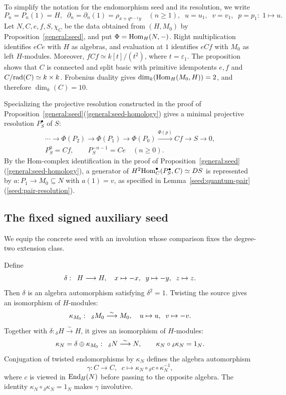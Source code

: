 \documentclass[11pt]{article}
\begin{document}
To simplify the notation for the endomorphism seed and its resolution, we write
$$P_n=P_n(1)=H,\;\; \partial_n=\partial_n(1)=\rho_{x+q^{n-1}y}\quad(n\geq 1),\;\; u=u_1,\;\;  v=v_1, \;\;  p=p_1:\; 1\mapsto u.$$
Let $N,C,e,f,S,\chi_C$ be the data obtained from $(H,M_0)$ by Proposition~\ref{general:seed}, and put
$\Phi={\rm Hom}_H(N,-)$. Right multiplication identifies $eCe$ with $H$ as algebras, and
evaluation at $1$ identifies $eCf$ with $M_0$ as left $H$-modules.
Moreover, $fCf\simeq k[t]/(t^2)$, where $t=\varepsilon_1$. The proposition shows that $C$ is connected and split basic with primitive idempotents $e,f$ and $C/{\rm rad}(C)\simeq k\times k$.
Frobenius duality gives $\dim_k({\rm Hom}_H(M_0,H))=2$, and therefore
$\dim_k(C)=10$.

Specializing the projective resolution constructed in the proof of
Proposition~\ref{general:seed}(\ref{general:seed-homology}) gives a minimal
projective resolution $P_S^\bullet$ of $S$:
\begin{equation*}
 \begin{gathered}
 \cdots\longrightarrow\Phi(P_2)\longrightarrow\Phi(P_1)\longrightarrow\Phi(P_0)
 \xrightarrow{\Phi(p)}Cf\longrightarrow S\longrightarrow0,\\
 P_S^0=Cf,\qquad P_S^{-n-1}=Ce\quad(n\ge0).
 \end{gathered}
\end{equation*}
By the Hom-complex identification in the proof of
Proposition~\ref{general:seed}\textup{(\ref{general:seed-homology})}, a generator of
$H^2{\rm Hom}_C^\bullet(P_S^\bullet,C)\simeq DS$ is represented by
$a:P_1\to M_0\subseteq N$ with $a(1)=v$, as specified in
Lemma~\ref{seed:quantum-pair}\textup{(\ref{seed:pair-resolution})}.

\subsection{The fixed signed auxiliary seed}
We equip the concrete seed with an involution whose comparison fixes the degree-two extension
class.

Define
$$\delta:\;\; H\longrightarrow H,\quad  x\mapsto -x,\;\; y\mapsto -y,\;\; z\mapsto z.$$
Then $\delta$ is an algebra automorphism satisfying $\delta^2=1$. Twisting the source gives an isomorphism of $H$-modules:
$$\kappa_{M_0}:\;\;{}_\delta M_0\stackrel{\sim}{\longrightarrow}M_0,\quad u\mapsto u, \;\; v\mapsto-v.$$
Together with $\delta:{}_\delta H\xrightarrow{\sim}H$,
it gives an isomorphism of $H$-modules:
$$\kappa_N=\delta\oplus\kappa_{M_0}:\;\;{}_\delta N\stackrel{\sim}{\longrightarrow}N,\qquad \kappa_N\circ{}_\delta\kappa_N=1_N.$$
Conjugation of twisted endomorphisms by $\kappa_N$ defines the algebra
automorphism
$$\gamma:C\longrightarrow C, \;\; c\mapsto \kappa_N\circ{}_\delta c\circ\kappa_N^{-1},$$
where $c$ is viewed in ${\rm End}_H(N)$ before passing to the opposite algebra.
The identity $\kappa_N\circ{}_\delta\kappa_N=1_N$ makes $\gamma$ involutive.
\end{document}
